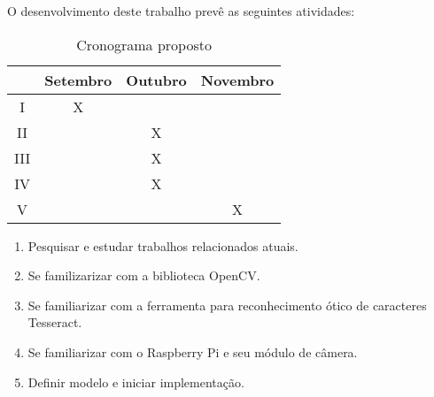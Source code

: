 O desenvolvimento deste trabalho prevê as seguintes atividades:

\begin{table}[H]
\centering
\label{tab:crono}
\begin{tabular}{c|c|c|c}
    & Setembro & Outubro & Novembro \\ \hline
I   & X        &         &          \\
II  &          & X       &          \\
III &          & X       &          \\
IV  &          & X       &          \\
V   &          &         & X       
\end{tabular}
\caption{Cronograma proposto}
\end{table}

\begin{enumerate}[I]
	\item Pesquisar e estudar trabalhos relacionados atuais.
	\item Se familizarizar com a biblioteca OpenCV\@.
	\item Se familiarizar com a ferramenta para reconhecimento ótico de caracteres Tesseract.
	\item Se familiarizar com o Raspberry Pi e seu módulo de câmera.
	\item Definir modelo e iniciar implementação.
\end{enumerate}

